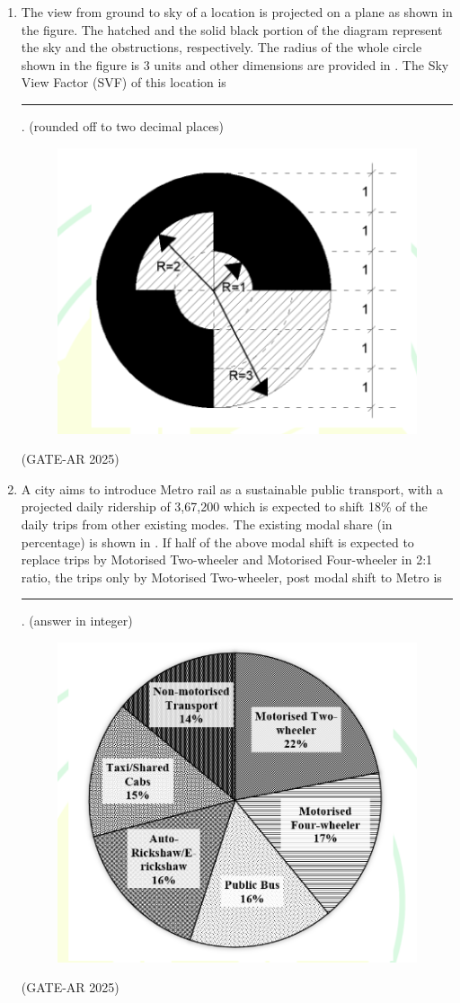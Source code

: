 \documentclass[a4paper,10pt]{article}
\begin{document}
\begin{enumerate}
\item The view from ground to sky of a location is projected on a plane as shown in the figure. The hatched and the solid black portion of the diagram represent the sky and the obstructions, respectively. The radius of the whole circle shown in the figure is 3 units and other dimensions are provided in . The Sky View Factor (SVF) of this location is \rule{2cm}{0.4pt}. (rounded off to two decimal places) \\
\begin{figure}[h!]
\centering
\includegraphics[width=0.4\columnwidth]{figs/08.jpg}
\caption{}
\label{fig:Img08}
\end{figure}
\hfill (GATE-AR 2025)

\newpage

\item A city aims to introduce Metro rail as a sustainable public transport, with a projected daily ridership of 3,67,200 which is expected to shift 18\% of the daily trips from other existing modes. The existing modal share (in percentage) is shown in . If half of the above modal shift is expected to replace trips by Motorised Two-wheeler and Motorised Four-wheeler in 2:1 ratio, the trips only by Motorised Two-wheeler, post modal shift to Metro is \rule{2cm}{0.4pt}. (answer in integer) \\
\begin{figure}[h!]
\centering
\includegraphics[width=0.5\columnwidth]{figs/09.jpg}
\caption{}
\label{fig:Img09}
\end{figure}
\hfill (GATE-AR 2025)


\end{enumerate}
\end{document}
